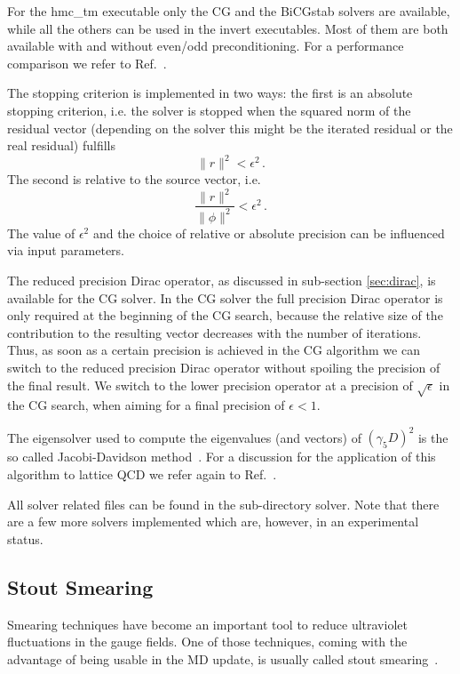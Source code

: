 For the {\ttfamily hmc\_tm} executable only the CG and the BiCGstab
solvers are available, while all the others can be used in the
{\ttfamily invert} executables. Most of them are both available with
and without even/odd preconditioning. For a performance comparison we
refer to Ref.~\cite{Chiarappa:2004ry,Chiarappa:2006hz}.

The stopping criterion is implemented in two ways: the first is an
absolute stopping criterion, i.e. the solver is stopped when the
squared norm of the residual vector (depending on the solver this
might be the iterated residual or the real residual) fulfills
\[
\|r\|^2 < \epsilon^2\, .
\]
The second is relative to the source vector, i.e.
\[
\frac{\|r\|^2}{\|\phi\|^2} < \epsilon^2\, .
\]
The value of $\epsilon^2$ and the choice of relative or absolute precision can be
influenced via input parameters.

The reduced precision Dirac operator, as discussed in sub-section
\ref{sec:dirac}, is available for the CG solver. In the CG solver the 
full precision Dirac operator is only required at the beginning of the
CG search, because the relative size of the contribution to the
resulting vector decreases with the number of iterations. Thus, as soon
as a certain precision is achieved in the CG algorithm we can switch to
the reduced precision Dirac operator without spoiling the precision of
the final result. We switch to the lower precision operator 
at a precision of $\sqrt{\epsilon}$ in the CG search, when aiming for a
final precision of $\epsilon < 1$.

The eigensolver used to compute the eigenvalues (and vectors) of
$(\gamma_5 D)^2$ is the so called Jacobi-Davidson 
method~\cite{Sleijpen:1996aa,Geus:2002}. For a discussion for the
application of this algorithm to lattice QCD we refer again to
Ref.~\cite{Chiarappa:2004ry,Chiarappa:2006hz}. 

All solver related files can be found in the sub-directory {\ttfamily
  solver}. Note that there are a few more solvers implemented which
are, however, in an experimental status.

\subsection{Stout Smearing}

Smearing techniques have become an important tool to reduce
ultraviolet fluctuations in the gauge fields. One of those techniques,
coming with the advantage of being usable in the MD update, is usually
called stout smearing~\cite{Morningstar:2003gk}. 


